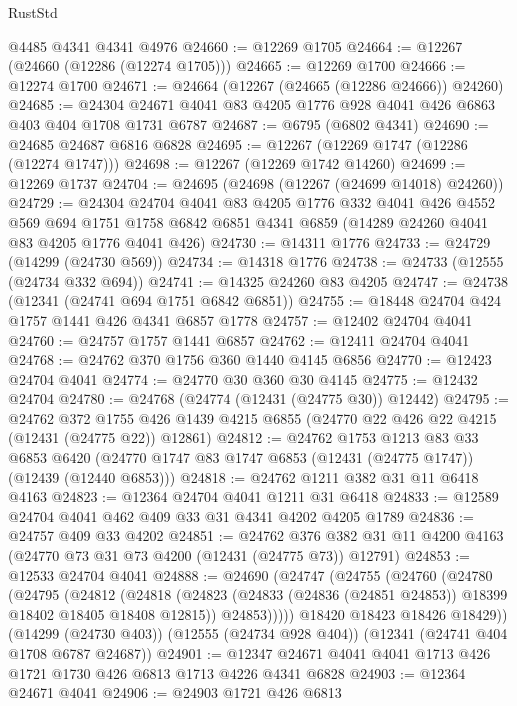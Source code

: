 \begin{lexlean}{RustStd}
\begin{coremodule}
    @4485
    @4341
    @4341
    @4976
@24660 := @12269 @1705
@24664 := @12267 (@24660 (@12286 (@12274 @1705)))
@24665 := @12269 @1700
@24666 := @12274 @1700
@24671 := @24664 (@12267 (@24665 (@12286 @24666)) @24260)
@24685 := @24304 @24671 @4041 @83 @4205 @1776 @928 @4041 @426 @6863 @403 @404 @1708 @1731 @6787
@24687 := @6795 (@6802 @4341)
@24690 := @24685 @24687 @6816 @6828
@24695 := @12267 (@12269 @1747 (@12286 (@12274 @1747)))
@24698 := @12267 (@12269 @1742 @14260)
@24699 := @12269 @1737
@24704 := @24695 (@24698 (@12267 (@24699 @14018) @24260))
@24729 := @24304
    @24704
    @4041
    @83
    @4205
    @1776
    @332
    @4041
    @426
    @4552
    @569
    @694
    @1751
    @1758
    @6842
    @6851
    @4341
    @6859
    (@14289 @24260 @4041 @83 @4205 @1776 @4041 @426)
@24730 := @14311 @1776
@24733 := @24729 (@14299 (@24730 @569))
@24734 := @14318 @1776
@24738 := @24733 (@12555 (@24734 @332 @694))
@24741 := @14325 @24260 @83 @4205
@24747 := @24738 (@12341 (@24741 @694 @1751 @6842 @6851))
@24755 := @18448 @24704 @424 @1757 @1441 @426 @4341 @6857 @1778
@24757 := @12402 @24704 @4041
@24760 := @24757 @1757 @1441 @6857
@24762 := @12411 @24704 @4041
@24768 := @24762 @370 @1756 @360 @1440 @4145 @6856
@24770 := @12423 @24704 @4041
@24774 := @24770 @30 @360 @30 @4145
@24775 := @12432 @24704
@24780 := @24768 (@24774 (@12431 (@24775 @30)) @12442)
@24795 := @24762
    @372
    @1755
    @426
    @1439
    @4215
    @6855
    (@24770 @22 @426 @22 @4215 (@12431 (@24775 @22)) @12861)
@24812 := @24762
    @1753
    @1213
    @83
    @33
    @6853
    @6420
    (@24770 @1747 @83 @1747 @6853 (@12431 (@24775 @1747)) (@12439 (@12440 @6853)))
@24818 := @24762 @1211 @382 @31 @11 @6418 @4163
@24823 := @12364 @24704 @4041 @1211 @31 @6418
@24833 := @12589 @24704 @4041 @462 @409 @33 @31 @4341 @4202 @4205 @1789
@24836 := @24757 @409 @33 @4202
@24851 := @24762
    @376
    @382
    @31
    @11
    @4200
    @4163
    (@24770 @73 @31 @73 @4200 (@12431 (@24775 @73)) @12791)
@24853 := @12533 @24704 @4041
@24888 := @24690
    (@24747
      (@24755
        (@24760
          (@24780
            (@24795
              (@24812
                (@24818
                  (@24823 (@24833 (@24836 (@24851 @24853)) @18399 @18402 @18405 @18408 @12815))
                  @24853)))))
        @18420
        @18423
        @18426
        @18429))
    (@14299 (@24730 @403))
    (@12555 (@24734 @928 @404))
    (@12341 (@24741 @404 @1708 @6787 @24687))
@24901 := @12347 @24671 @4041 @4041 @1713 @426 @1721 @1730 @426 @6813 @1713 @4226 @4341 @6828
@24903 := @12364 @24671 @4041
@24906 := @24903 @1721 @426 @6813

\end{coremodule}
\end{lexlean}
